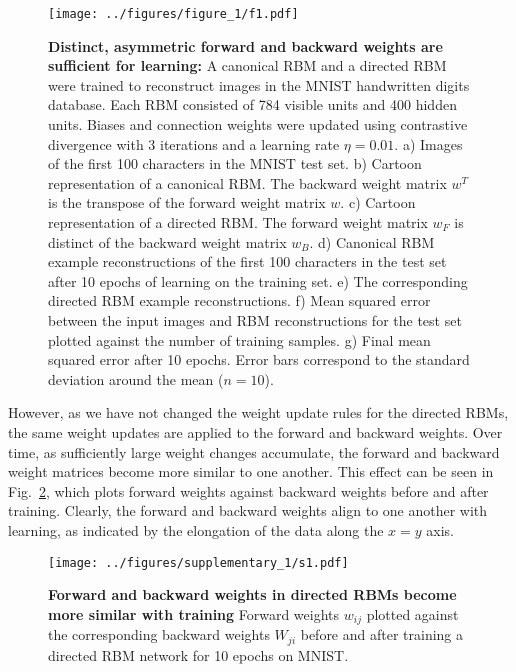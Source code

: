 \documentclass[11pt]{article}
\begin{document}
\begin{figure}[H]
  \label{fig:directed_rbm}
  \centering
  \texttt{[image: ../figures/figure\_1/f1.pdf]}
  \caption{\footnotesize
    \textbf{Distinct, asymmetric forward and backward weights are sufficient for learning:}
    A canonical RBM and a directed RBM were trained to reconstruct
    images in the MNIST handwritten digits database.
    Each RBM consisted of 784 visible units and 400 hidden units.
    Biases and connection weights were updated using contrastive
    divergence with 3 iterations and a learning rate $\eta=0.01$.
    a) Images of the first 100 characters in the MNIST test set.
    b) Cartoon representation of a canonical RBM. The backward weight
    matrix $w^T$ is the transpose of the forward weight matrix $w$.
    c) Cartoon representation of a directed RBM. The forward weight
    matrix $w_F$ is distinct of the backward weight matrix $w_B$.
    d) Canonical RBM example reconstructions of the first 100
    characters in the test set after 10 epochs of learning on the
    training set.
    e) The corresponding directed RBM example reconstructions.
    f) Mean squared error between the input images and RBM
    reconstructions for the test set plotted against the number of
    training samples.
    g) Final mean squared error after 10 epochs. Error bars correspond
    to the standard deviation around the mean ($n = 10$).
  }
\end{figure}

However, as we have not changed the weight update rules for the
directed RBMs, the same weight updates are applied to the forward and
backward weights. Over time, as sufficiently large weight changes
accumulate, the forward and backward weight matrices become more
similar to one another. This effect can be seen in
Fig.~\ref{fig:weight_alignment}, which plots forward weights against
backward weights before and after training. Clearly, the forward and
backward weights align to one another with learning, as indicated by
the elongation of the data along the $x=y$ axis.

\begin{figure}[H]
  \label{fig:weight_alignment}
  \centering
  \texttt{[image: ../figures/supplementary\_1/s1.pdf]}
  \caption{\textbf{Forward and backward weights in directed RBMs
      become more similar with training}
    Forward weights $w_{ij}$ plotted against the corresponding
    backward weights $W_{ji}$ before and after training a directed RBM
    network for 10 epochs on MNIST.
  }
\end{figure}
\end{document}
